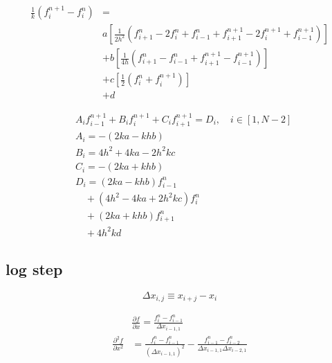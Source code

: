 \documentclass{article}
\begin{document}
    \begin{equation}
        \begin{split}
            \frac{1}{k}\left(f_i^{n+1} - f_i^n\right) &=
            \\
            & a \left[
                \frac{1}{2h^2} \left( f_{i+1}^n - 2f_i^{n} + f_{i-1}^n
                     + f_{i+1}^{n+1} - 2f_i^{n+1} +f_{i-1}^{n+1} \right)
                     \right]
            \\
            & + b \left[ 
            \frac{1}{4h}
                \left( f_{i+1}^n - f_{i-1}^n + f_{i+1}^{n+1} - f_{i-1}^{n+1} \right)
                     \right]
            \\
            & + c \left[ 
                \frac{1}{2} \left( f_i^n + f_i^{n+1} \right)
                     \right]
            \\
            & + d
        \end{split}
    \end{equation}

    \begin{equation}
        \begin{split}
            &A_i f_{i-1}^{n+1} + B_i f_i^{n+1} + C_i f_{i+1}^{n+1} = D_i, \quad i \in [1, N-2]
            \\
            &A_i = -(2ka - khb)
            \\
            &B_i = 4h^2 + 4ka - 2h^2kc
            \\
            &C_i = -( 2ka + khb )
            \\
            &D_i = (2ka - khb) f_{i-1}^{n}
            \\
            &\quad + (4h^2 - 4ka + 2h^2kc) f_i^n 
            \\
            &\quad + (2ka + khb) f_{i+1}^{n}
            \\
            &\quad + 4h^2kd
        \end{split}
    \end{equation}

\subsection{log step}

    \begin{equation}
        \Delta x_{i,j} \equiv x_{i+j} - x_i
    \end{equation}

    \begin{equation}
        \begin{split}
            & \frac{\partial f}{\partial x} =
            \frac{f_{i}^n -f_{i-1}^n }
                {\Delta x_{i-1,1}}
            \\
            \frac{\partial^2 f}{\partial x^2} &=
            \frac{f_i^n-f_{i-1}^n}{\left(\Delta x_{i-1,1}\right)^2} -
            \frac{f_{i-1}^n-f_{i-2}^n}{\Delta x_{i-1,1} \Delta x_{i-2,1}}
        \end{split}
    \end{equation}
\end{document}
